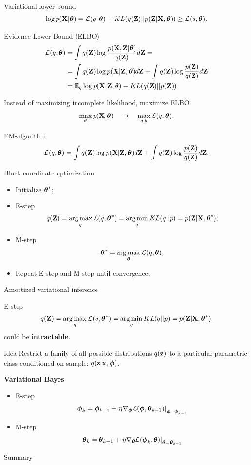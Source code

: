 \begin{frame}{Variational lower bound}
\[
    \log p(\mathbf{X}| \boldsymbol{\theta}) = \mathcal{L} (q, \boldsymbol{\theta}) + KL(q(\mathbf{Z}) || p(\mathbf{Z}|\mathbf{X}, \boldsymbol{\theta})) \geq \mathcal{L} (q, \boldsymbol{\theta}).
\]
\begin{block}{Evidence Lower Bound (ELBO)}
\begin{align*}
    \mathcal{L} (q, \boldsymbol{\theta}) &= \int q(\mathbf{Z}) \log \frac{p(\mathbf{X}, \mathbf{Z} | \boldsymbol{\theta})}{q(\mathbf{Z})}d\mathbf{Z} = \\ 
    &= \int q(\mathbf{Z}) \log p(\mathbf{X} | \mathbf{Z}, \boldsymbol{\theta}) d\mathbf{Z} + \int q(\mathbf{Z}) \log \frac{p(\mathbf{Z})}{q(\mathbf{Z})}d\mathbf{Z} \\ 
    &= \mathbb{E}_{q} \log p(\mathbf{X} | \mathbf{Z}, \boldsymbol{\theta}) - KL (q(\mathbf{Z}) || p(\mathbf{Z}))
\end{align*}
\end{block}
Instead of maximizing incomplete likelihood, maximize ELBO
\[
    \max_{\theta} p(\mathbf{X} | \boldsymbol{\theta}) \quad \rightarrow \quad \max_{q, \theta} \mathcal{L} (q, \boldsymbol{\theta}).
\]
    
\end{frame}
\begin{frame}{EM-algorithm}
	\[
		\mathcal{L} (q, \boldsymbol{\theta})  = \int q(\mathbf{Z}) \log p(\mathbf{X} | \mathbf{Z}, \boldsymbol{\theta}) d\mathbf{Z} + \int q(\mathbf{Z}) \log \frac{p(\mathbf{Z})}{q(\mathbf{Z})}d\mathbf{Z}.
	\]
	\begin{block}{Block-coordinate optimization}
	\begin{itemize}
		\item Initialize $\boldsymbol{\theta}^*$;
		\item E-step
		\[
			q(\mathbf{Z}) = \operatorname*{arg\,max}_q \mathcal{L} (q, \boldsymbol{\theta}^*) = \operatorname*{arg\,min}_q KL(q || p) =
			 p(\mathbf{Z}| \mathbf{X}, \boldsymbol{\theta}^*);
		\]
		\item M-step
		\[
			\boldsymbol{\theta}^* = \operatorname*{arg\,max}_{\boldsymbol{\theta}} \mathcal{L} (q, \boldsymbol{\theta});
		\]
		\item Repeat E-step and M-step until convergence.
	\end{itemize}
	\end{block}
\end{frame}
\begin{frame}{Amortized variational inference}
    \begin{block}{E-step}
    \vspace{-0.3cm}
    \[
		q(\mathbf{Z}) = \operatorname*{arg\,max}_q \mathcal{L} (q, \boldsymbol{\theta}^*) = \operatorname*{arg\,min}_q KL(q || p) =
		 p(\mathbf{Z}| \mathbf{X}, \boldsymbol{\theta}^*).
	\]
	could be \textbf{intractable}.
    \end{block}
	\begin{block}{Idea}
	Restrict a family of all possible distributions $q(\mathbf{z})$ to a particular parametric class conditioned on sample: $q(\mathbf{z}|\mathbf{x}, \boldsymbol{\phi})$.
	\end{block}
	
	\textbf{Variational Bayes}
	\begin{itemize}
		\item E-step
		\[
		\boldsymbol{\phi}_k = \boldsymbol{\phi}_{k-1} + \left.\eta \nabla_{\boldsymbol{\phi}} \mathcal{L}(\boldsymbol{\phi}, \boldsymbol{\theta}_{k-1})\right|_{\boldsymbol{\phi}=\boldsymbol{\phi}_{k-1}}
		\]
		\item M-step
		\[
		\boldsymbol{\theta}_k = \boldsymbol{\theta}_{k-1} + \left.\eta \nabla_{\boldsymbol{\theta}} \mathcal{L}(\boldsymbol{\phi}_k, \boldsymbol{\theta})\right|_{\boldsymbol{\theta}=\boldsymbol{\theta}_{k-1}}
		\]
	\end{itemize}
\end{frame}
\begin{frame}{Summary}
\end{frame}
 